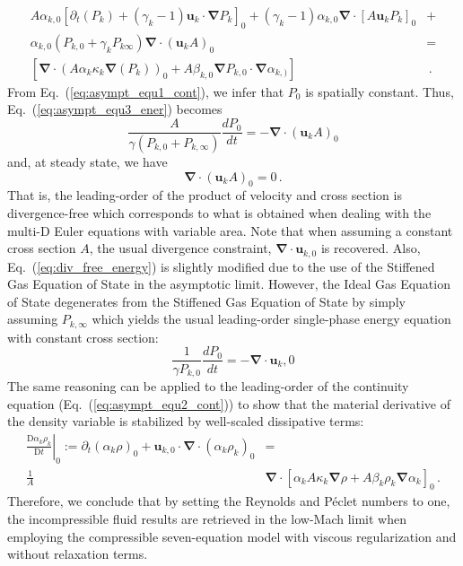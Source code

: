 \documentclass[preprint,10pt]{elsarticle}
\renewcommand{\div}{\mbold{\nabla}\! \cdot \!}
\newcommand{\grad}{\mbold{\nabla}}
\newcommand{\mbold}[1]{\boldsymbol#1}
\newcommand{\matder}[1]{\frac{\textrm{D} #1}{\textrm{D} t}}
\newcommand{\eqt}[1]{Eq.~(\ref{#1})}                     %
\begin{document}
%
\begin{align}\label{eq:asympt_equ3_ener}
A \alpha_{k,0} \left[ \partial_t \left( P_k \right) + (\gamma_k-1)\mbold u_k \cdot \grad  P_k \right]_0+ (\gamma_k-1) \alpha_{k,0} \div \left[ A \mbold u_k P_k \right]_0 &+ \nonumber \\
\alpha_{k,0} \left( P_{k,0} + \gamma_k P_{k\infty} \right) \div \left( \mbold u_k A\right)_0 &= \nonumber \\
\left[ \div(A \alpha_k \kappa_k \grad(P_k))_0 + A \beta_{k,0} \grad P_{k,0} \cdot \grad \alpha_{k,)} \right] & \,.
\end{align}
%
From \eqt{eq:asympt_equ1_cont}, we infer that $P_0$ is spatially constant. Thus, \eqt{eq:asympt_equ3_ener} becomes
%
\begin{equation}\label{eq:div_free_energy}
\frac{A}{\gamma\left( P_{k,0} + P_{k,\infty} \right)} \frac{d P_0}{dt} = - \div \left( \mbold u_k A \right)_0 
\end{equation}
%
and, at steady state, we have
%
\begin{equation}
\div \left( \mbold u_k A \right)_0  = 0 \, .
\end{equation}
%
That is, the leading-order of the product of velocity and cross section is divergence-free which corresponds to what is obtained when dealing with the multi-D Euler equations with variable area. Note that when assuming a constant cross section $A$, the usual divergence constraint, $\div \mbold u_{k,0}$ is recovered. Also, \eqt{eq:div_free_energy} is slightly modified due to the use of the Stiffened Gas Equation of State in the asymptotic limit. However, the Ideal Gas Equation of State degenerates from the Stiffened Gas Equation of State by simply assuming $P_{k,\infty}$ which yields the usual leading-order single-phase energy equation with constant cross section:
%
\begin{equation}
\frac{1}{\gamma P_{k,0}} \frac{d P_0}{dt} = - \div\mbold u_k{,0} 
\end{equation}
%
The same reasoning can be applied to the leading-order 
of the continuity equation (\eqt{eq:asympt_equ2_cont}) to show that the material derivative of the density variable is stabilized by well-scaled dissipative terms:
\begin{align}
\left. \matder{\alpha_k \rho_k}\right|_0 := \partial_t \left( \alpha_k \rho\right)_0 + \mbold u_{k,0} \cdot \div \left( \alpha_k \rho_k \right)_0 &= \nonumber \\
\frac{1}{A} & \div \left[ \alpha_k A \kappa_k \grad \rho + A \beta_k \rho_k \grad \alpha_k \right]_0 \, .
\end{align}
%
Therefore, we conclude that by setting the Reynolds and P\'eclet numbers to one, the incompressible fluid 
results are retrieved in the low-Mach limit when employing the compressible seven-equation model with viscous regularization and without relaxation terms.
\end{document}
